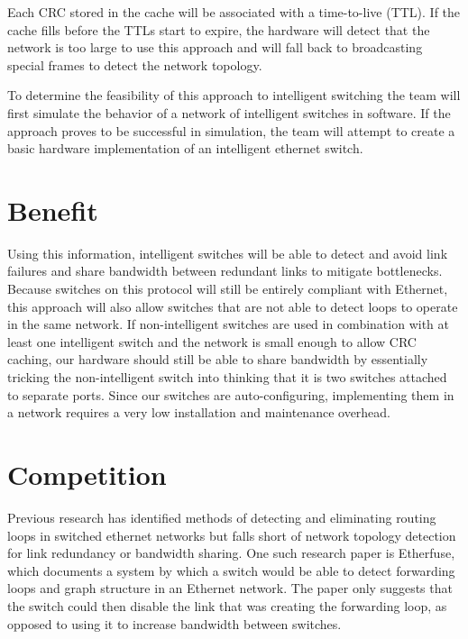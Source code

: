 \documentclass{article}
\begin{document}
	Each CRC stored in the cache will be associated with a time-to-live (TTL).
	If the cache fills before the TTLs start to expire, the hardware will detect that the network is too large to use this approach and will fall back to broadcasting special frames to detect the network topology.

	To determine the feasibility of this approach to intelligent switching the team will first simulate the behavior of a network of intelligent switches in software.
	If the approach proves to be successful in simulation, the team will attempt to create a basic hardware implementation of an intelligent ethernet switch.
\section{Benefit}
	Using this information, intelligent switches will be able to detect and avoid link failures and share bandwidth between redundant links to mitigate bottlenecks.
	Because switches on this protocol will still be entirely compliant with Ethernet, this approach will also allow switches that are not able to detect loops to operate in the same network.
	If non-intelligent switches are used in combination with at least one intelligent switch and the network is small enough to allow CRC caching, our hardware should still be able to share bandwidth by essentially tricking the non-intelligent switch into thinking that it is two switches attached to separate ports.
	Since our switches are auto-configuring, implementing them in a network requires a very low installation and maintenance overhead.
\section{Competition}
	Previous research has identified methods of detecting and eliminating routing loops in switched ethernet networks but falls short of network topology detection for link redundancy or bandwidth sharing.
	One such research paper is Etherfuse, which documents a system by which a switch would be able to detect forwarding loops and graph structure in an Ethernet network.
	The paper only suggests that the switch could then disable the link that was creating the forwarding loop, as opposed to using it to increase bandwidth between switches.
\end{document}
